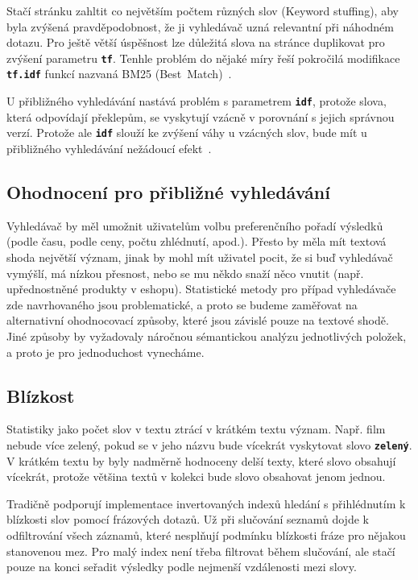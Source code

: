 \documentclass[11pt,letterpaper,oneside,openright]{book}
\newcommand{\bftt}[1]{\texttt{\textbf{#1}}}
\begin{document}
Stačí stránku zahltit co největším počtem různých slov (Keyword stuffing), aby
byla zvýšená pravděpodobnost, že ji vyhledávač uzná relevantní při náhodném
dotazu. Pro ještě větší úspěšnost lze důležitá slova na stránce duplikovat pro
zvýšení parametru \bftt{tf}. Tenhle problém do nějaké míry řeší pokročilá
modifikace \bftt{tf.idf} funkcí nazvaná BM25
(Best~Match)~\cite{Robertson:2009:PRF:1704809.1704810}.

U přibližného vyhledávání nastává problém s parametrem \bftt{idf}, protože slova,
která odpovídají překlepům, se vyskytují vzácně v porovnání s jejich správnou
verzí. Protože ale \bftt{idf} slouží ke zvýšení váhy u vzácných slov, bude mít
u přibližného vyhledávání nežádoucí efekt~\cite{elastic_fuzzy}.

\subsection{Ohodnocení pro přibližné vyhledávání}
Vyhledávač by měl umožnit uživatelům volbu preferenčního pořadí výsledků (podle
času, podle ceny, počtu zhlédnutí, apod.). Přesto by měla mít textová shoda
největší význam, jinak by mohl mít uživatel pocit, že si buď vyhledávač
vymýšlí, má nízkou přesnost, nebo se mu někdo snaží něco vnutit (např.
upřednostněné produkty v eshopu). Statistické metody pro případ vyhledávače zde
navrhovaného jsou problematické, a proto se budeme zaměřovat na alternativní
ohodnocovací způsoby, které jsou závislé pouze na textové shodě. Jiné způsoby
by vyžadovaly náročnou sémantickou analýzu jednotlivých položek, a proto je pro
jednoduchost vynecháme.


\subsection{Blízkost}
Statistiky jako počet slov v textu ztrácí v krátkém textu význam. Např. film
nebude více zelený, pokud se v jeho názvu bude vícekrát vyskytovat slovo
\bftt{zelený}. V krátkém textu by byly nadměrně hodnoceny delší texty, které
slovo obsahují vícekrát, protože většina textů v kolekci bude slovo obsahovat
jenom jednou.

Tradičně podporují implementace invertovaných indexů hledání s přihlédnutím k
blízkosti slov pomocí frázových dotazů. Už při slučování seznamů dojde k
odfiltrování všech záznamů, které nesplňují podmínku blízkosti fráze pro
nějakou stanovenou mez. Pro malý index není třeba filtrovat během slučování,
ale stačí pouze na konci seřadit výsledky podle nejmenší vzdálenosti mezi
slovy.
\end{document}
